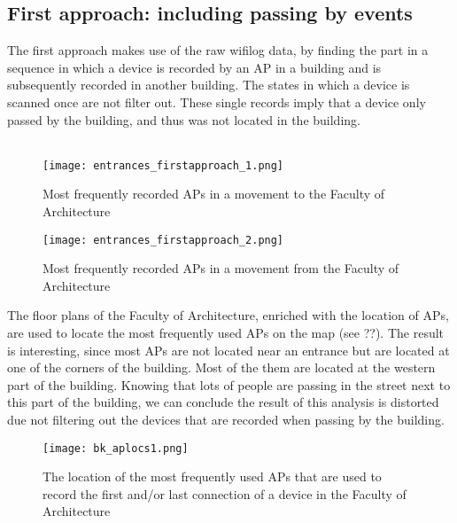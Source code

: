 \subsection{First approach: including passing by events}
The first approach makes use of the raw wifilog data, by finding the part in a sequence in which a device is recorded by an AP in a building and is subsequently recorded in another building. The states in which a device is scanned once are not filter out. These single records imply that a device only passed by the building, and thus was not located in the building. \\\\
\begin{figure}[H]
	\centering
	\texttt{[image: entrances\_firstapproach\_1.png]}
	\captionsetup{justification=centering}
	\caption{Most frequently recorded APs in a movement to the Faculty of Architecture}
	\label{firstapproach_graph}
\end{figure}
\begin{figure}[H]
	\centering
	\texttt{[image: entrances\_firstapproach\_2.png]}
	\captionsetup{justification=centering}
	\caption{Most frequently recorded APs in a movement from the Faculty of Architecture}
	\label{firstapproach_graph}
\end{figure}
The floor plans of the Faculty of Architecture, enriched with the location of APs, are used to locate the most frequently used APs on the map (see ??). The result is interesting, since most APs are not located near an entrance but are located at one of the corners of the building. Most of the them are located at the western part of the building. Knowing that lots of people are passing in the street next to this part of the building, we can conclude the result of this analysis is distorted due not filtering out the devices that are recorded when passing by the building.
\begin{figure}[H]
	\centering
	\texttt{[image: bk\_aplocs1.png]}
	\captionsetup{justification=centering}
	\caption{The location of the most frequently used APs that are used to record the first and/or last connection of a device in the Faculty of Architecture}
	\label{firstapproach_map}
\end{figure}
